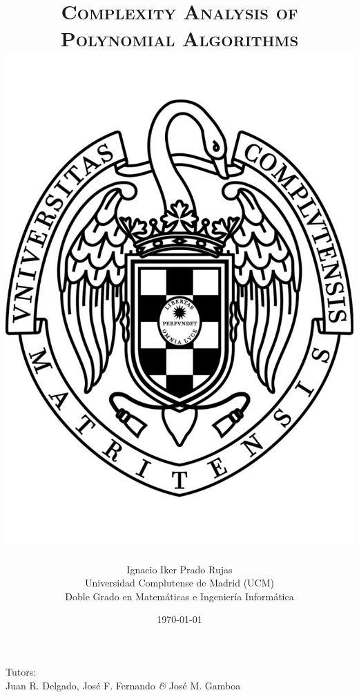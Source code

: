 \documentclass[11pt, a4paper, english, twoside, notitlepage, openright]{report}
\begin{document}
\begin{titlepage}

\title{\huge{\textsc{Complexity Analysis of\\
Polynomial Algorithms}} \\
\vspace{1.5cm}
\protect\includegraphics[scale=0.35]{ucm.pdf}
\vspace{1.5cm}}
\author{Ignacio Iker Prado Rujas \\
Universidad Complutense de Madrid (UCM) \\
Doble Grado en Matem\'aticas e Ingenier\'ia Inform\'atica}
\date{\today}
\maketitle
\thispagestyle{empty}

\begin{center}
Tutors: \\
Juan R. Delgado, Jos\'e F. Fernando \textit{\&} Jos\'e M. Gamboa \\
\
\end{center}

\end{titlepage}
\end{document}
